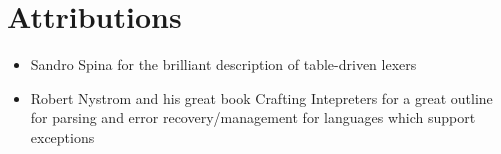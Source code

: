 \documentclass[article]{uom-coursework}
\begin{document}

\section{Attributions}

\begin{itemize}
    \item Sandro Spina for the brilliant description of table-driven lexers
    \item Robert Nystrom and his great book Crafting Intepreters for a great
        outline for parsing and error recovery/management for languages
        which support exceptions
\end{itemize}
\end{document}
